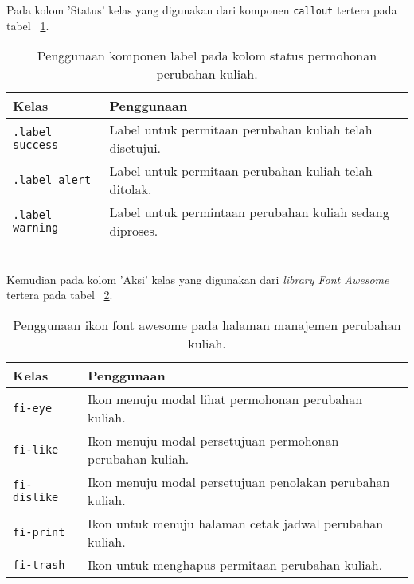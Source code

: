 \noindent Pada kolom 'Status' kelas yang digunakan dari komponen \texttt{callout} tertera pada tabel ~\ref{table:analisisLabelManajemenPerubahanKuliah}.
\begin{table}[H]
	\centering
	\caption{Penggunaan komponen label pada kolom status permohonan perubahan kuliah.}
	\begin{tabularx}{\textwidth}{lX}
		\toprule
		Kelas     & Penggunaan \\
		\midrule
		\texttt{.label success} & Label untuk permitaan perubahan kuliah telah disetujui.\\
		\texttt{.label alert} &  Label untuk permitaan perubahan kuliah telah ditolak.\\
		\texttt{.label warning} & Label untuk permintaan perubahan kuliah sedang diproses.\\
		\bottomrule
	\end{tabularx}%
	\label{table:analisisLabelManajemenPerubahanKuliah}
\end{table}\\

\noindent Kemudian pada kolom 'Aksi' kelas yang digunakan dari \textit{library Font Awesome} tertera pada tabel ~\ref{table:analisisIkonManajemenPerubahanKuliah}.
\begin{table}[H]
	\centering
	\caption{Penggunaan ikon font awesome pada halaman manajemen perubahan kuliah.}
	\begin{tabularx}{\textwidth}{lX}
		\toprule
		Kelas     & Penggunaan \\
		\midrule
		\texttt{fi-eye} & Ikon menuju modal lihat permohonan perubahan kuliah.\\
		\texttt{fi-like} & Ikon menuju modal persetujuan permohonan perubahan kuliah.\\
		\texttt{fi-dislike} & Ikon menuju modal persetujuan penolakan perubahan kuliah.\\
		\texttt{fi-print} & Ikon untuk menuju halaman cetak jadwal perubahan kuliah.\\
		\texttt{fi-trash} & Ikon untuk menghapus permitaan perubahan kuliah.\\
		\bottomrule
	\end{tabularx}%
	\label{table:analisisIkonManajemenPerubahanKuliah}
\end{table}

